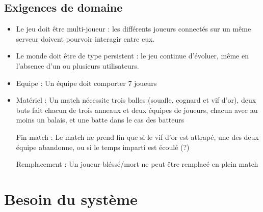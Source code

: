 \documentclass[a4paper]{article}
\begin{document}
\subsection{Exigences de domaine}
\begin{itemize}
\item Le jeu doit être multi-joueur : les différents joueurs connectés sur un même serveur doivent pourvoir interagir entre eux.
\item Le monde doit être de type persistent : le jeu continue d'évoluer, même en l'absence d'un ou plusieurs utilisateurs.
\item Equipe : Un équipe doit comporter 7 joueurs %
\item Matériel : Un match nécessite trois balles (souafle, cognard et vif d'or), deux buts fait chacun de trois anneaux et deux équipes de joueurs, chacun avec au moins un balais, et une batte dans le cas des batteurs %
\item[Fin match] : Le match ne prend fin que si le vif d'or est attrapé, une des deux équipe abandonne, ou si le temps imparti est écoulé (?)
\item[Remplacement] : Un joueur bléssé/mort ne peut être remplacé en plein match 
\end{itemize}


\section{Besoin du système}
\end{document}

